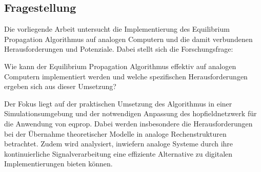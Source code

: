 \subsection{Fragestellung}

Die vorliegende Arbeit untersucht die Implementierung des Equilibrium Propagation Algorithmus auf analogen Computern und die damit verbundenen Herausforderungen und Potenziale. Dabei stellt sich die Forschungsfrage:

Wie kann der Equilibrium Propagation Algorithmus effektiv auf analogen Computern implementiert werden und welche spezifischen Herausforderungen ergeben sich aus dieser Umsetzung?

Der Fokus liegt auf der praktischen Umsetzung des Algorithmus in einer Simulationsumgebung und der notwendigen Anpassung des \gls{hopfieldnetzwerk} für die Anwendung von \gls{eqprop}. Dabei werden insbesondere die Herausforderungen bei der Übernahme theoretischer Modelle in analoge Rechenstrukturen betrachtet. Zudem wird analysiert, inwiefern analoge Systeme durch ihre kontinuierliche Signalverarbeitung eine effiziente Alternative zu digitalen Implementierungen bieten können.
